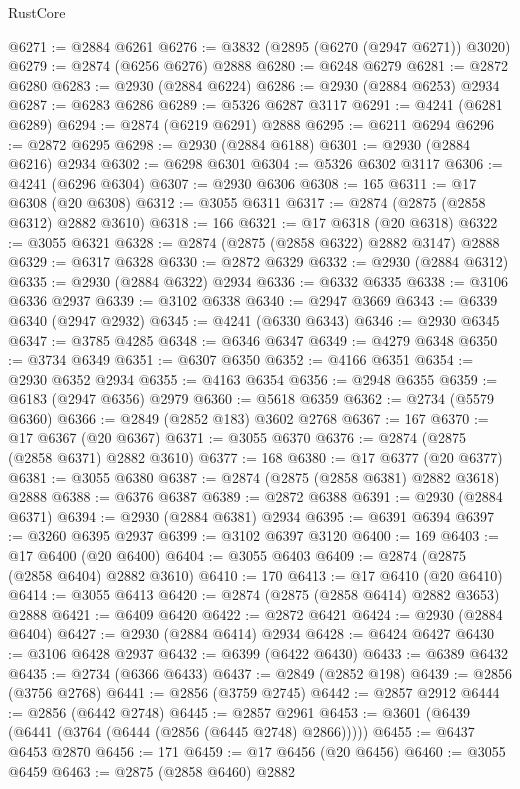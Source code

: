 \begin{lexlean}{RustCore}
\begin{coremodule}
@6271 := @2884 @6261
@6276 := @3832 (@2895 (@6270 (@2947 @6271)) @3020)
@6279 := @2874 (@6256 @6276) @2888
@6280 := @6248 @6279
@6281 := @2872 @6280
@6283 := @2930 (@2884 @6224)
@6286 := @2930 (@2884 @6253) @2934
@6287 := @6283 @6286
@6289 := @5326 @6287 @3117
@6291 := @4241 (@6281 @6289)
@6294 := @2874 (@6219 @6291) @2888
@6295 := @6211 @6294
@6296 := @2872 @6295
@6298 := @2930 (@2884 @6188)
@6301 := @2930 (@2884 @6216) @2934
@6302 := @6298 @6301
@6304 := @5326 @6302 @3117
@6306 := @4241 (@6296 @6304)
@6307 := @2930 @6306
@6308 := 165
@6311 := @17 @6308 (@20 @6308)
@6312 := @3055 @6311
@6317 := @2874 (@2875 (@2858 @6312) @2882 @3610)
@6318 := 166
@6321 := @17 @6318 (@20 @6318)
@6322 := @3055 @6321
@6328 := @2874 (@2875 (@2858 @6322) @2882 @3147) @2888
@6329 := @6317 @6328
@6330 := @2872 @6329
@6332 := @2930 (@2884 @6312)
@6335 := @2930 (@2884 @6322) @2934
@6336 := @6332 @6335
@6338 := @3106 @6336 @2937
@6339 := @3102 @6338
@6340 := @2947 @3669
@6343 := @6339 @6340 (@2947 @2932)
@6345 := @4241 (@6330 @6343)
@6346 := @2930 @6345
@6347 := @3785 @4285
@6348 := @6346 @6347
@6349 := @4279 @6348
@6350 := @3734 @6349
@6351 := @6307 @6350
@6352 := @4166 @6351
@6354 := @2930 @6352 @2934
@6355 := @4163 @6354
@6356 := @2948 @6355
@6359 := @6183 (@2947 @6356) @2979
@6360 := @5618 @6359
@6362 := @2734 (@5579 @6360)
@6366 := @2849 (@2852 @183) @3602 @2768
@6367 := 167
@6370 := @17 @6367 (@20 @6367)
@6371 := @3055 @6370
@6376 := @2874 (@2875 (@2858 @6371) @2882 @3610)
@6377 := 168
@6380 := @17 @6377 (@20 @6377)
@6381 := @3055 @6380
@6387 := @2874 (@2875 (@2858 @6381) @2882 @3618) @2888
@6388 := @6376 @6387
@6389 := @2872 @6388
@6391 := @2930 (@2884 @6371)
@6394 := @2930 (@2884 @6381) @2934
@6395 := @6391 @6394
@6397 := @3260 @6395 @2937
@6399 := @3102 @6397 @3120
@6400 := 169
@6403 := @17 @6400 (@20 @6400)
@6404 := @3055 @6403
@6409 := @2874 (@2875 (@2858 @6404) @2882 @3610)
@6410 := 170
@6413 := @17 @6410 (@20 @6410)
@6414 := @3055 @6413
@6420 := @2874 (@2875 (@2858 @6414) @2882 @3653) @2888
@6421 := @6409 @6420
@6422 := @2872 @6421
@6424 := @2930 (@2884 @6404)
@6427 := @2930 (@2884 @6414) @2934
@6428 := @6424 @6427
@6430 := @3106 @6428 @2937
@6432 := @6399 (@6422 @6430)
@6433 := @6389 @6432
@6435 := @2734 (@6366 @6433)
@6437 := @2849 (@2852 @198)
@6439 := @2856 (@3756 @2768)
@6441 := @2856 (@3759 @2745)
@6442 := @2857 @2912
@6444 := @2856 (@6442 @2748)
@6445 := @2857 @2961
@6453 := @3601 (@6439 (@6441 (@3764 (@6444 (@2856 (@6445 @2748) @2866)))))
@6455 := @6437 @6453 @2870
@6456 := 171
@6459 := @17 @6456 (@20 @6456)
@6460 := @3055 @6459
@6463 := @2875 (@2858 @6460) @2882

\end{coremodule}
\end{lexlean}
